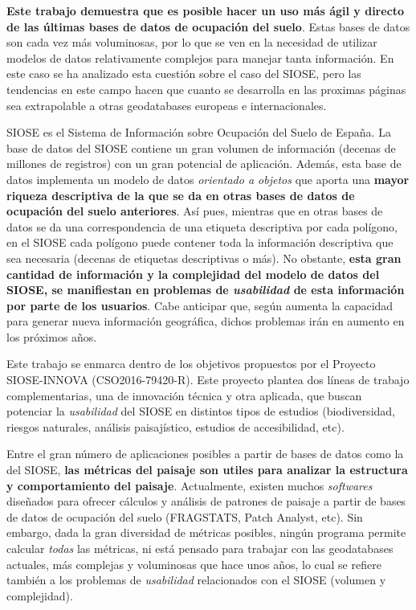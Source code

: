 
\begin{resumen}

\textbf{Este trabajo demuestra que es posible hacer un uso más ágil y directo de las últimas bases de datos de ocupación del suelo}. Estas bases de datos son cada vez más voluminosas, por lo que se ven en la necesidad de utilizar modelos de datos relativamente complejos para manejar tanta información. En este caso se ha analizado esta cuestión sobre el caso del SIOSE, pero las tendencias en este campo hacen que cuanto se desarrolla en las proximas páginas sea extrapolable a otras geodatabases europeas e internacionales.

SIOSE es el Sistema de Información sobre Ocupación del Suelo de España. La base de datos del SIOSE contiene un gran volumen de información (decenas de millones de registros) con un gran potencial de aplicación. Además, esta base de datos implementa un modelo de datos \textit{orientado a objetos} que aporta una \textbf{mayor riqueza descriptiva de la que se da en otras bases de datos de ocupación del suelo anteriores}. Así pues, mientras que en otras bases de datos se da una correspondencia de una etiqueta descriptiva por cada polígono, en el SIOSE cada polígono puede contener toda la información descriptiva que sea necesaria (decenas de etiquetas descriptivas o más). No obstante, \textbf{esta gran cantidad de información y la complejidad del modelo de datos del SIOSE, se manifiestan en problemas de \textit{usabilidad} de esta información por parte de los usuarios}. Cabe anticipar que, según aumenta la capacidad para generar nueva información geográfica, dichos problemas irán en aumento en los próximos años.

Este trabajo se enmarca dentro de los objetivos propuestos por el Proyecto SIOSE-INNOVA (CSO2016-79420-R). Este proyecto plantea dos líneas de trabajo complementarias, una de innovación técnica y otra aplicada, que buscan potenciar la \textit{usabilidad} del SIOSE en distintos tipos de estudios (biodiversidad, riesgos naturales, análisis paisajístico, estudios de accesibilidad, etc).

Entre el gran número de aplicaciones posibles a partir de bases de datos como la del SIOSE, \textbf{las métricas del paisaje son utiles para analizar la estructura y comportamiento del paisaje}. Actualmente, existen muchos \textit{softwares} diseñados para ofrecer cálculos y análisis de patrones de paisaje a partir de bases de datos de ocupación del suelo (FRAGSTATS, Patch Analyst, etc). Sin embargo, dada la gran diversidad de métricas posibles, ningún programa permite calcular \textit{todas} las métricas, ni está pensado para trabajar con las geodatabases actuales, más complejas y voluminosas que hace unos años, lo cual se refiere también a los problemas de \textit{usabilidad} relacionados con el SIOSE (volumen y complejidad).


\end{resumen}
